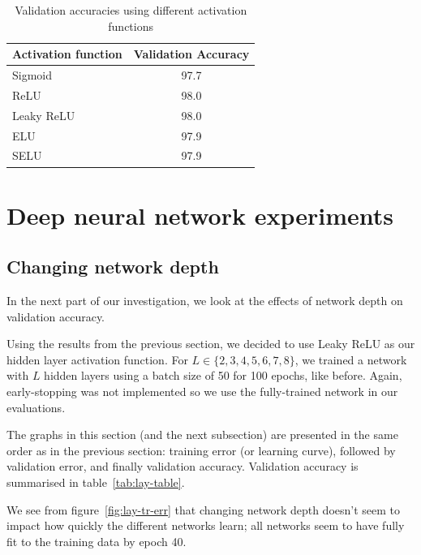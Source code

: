 \documentclass{article}
\begin{document}
\begin{table}[tb]
\vskip 3mm
\begin{center}
\begin{small}
\begin{sc}
\begin{tabular}{lc}
\hline
\abovespace\belowspace
Activation function & Validation Accuracy  \\
\hline
\abovespace
Sigmoid    & 97.7  \\
ReLU & 98.0  \\
Leaky ReLU    & 98.0 \\
ELU    &  97.9\\
SELU   &  97.9 \\
\end{tabular}
\end{sc}
\end{small}
\caption{Validation accuracies using different activation functions}
\label{tab:act-table}
\end{center}
\vskip -3mm
\end{table}

\section{Deep neural network experiments}
\label{sec:dnnexpts}
\subsection{Changing network depth}
In the next part of our investigation, we look at the effects of network depth on validation accuracy. 

Using the results from the previous section, we decided to use Leaky ReLU as our hidden layer activation function. For $L \in \{2, 3, 4, 5, 6, 7, 8\}$, we trained a network with $L$ hidden layers using a batch size of 50 for 100 epochs, like before. Again, early-stopping was not implemented so we use the fully-trained network in our evaluations.

The graphs in this section (and the next subsection) are presented in the same order as in the previous section: training error (or learning curve), followed by validation error, and finally validation accuracy. Validation accuracy is summarised in table~\ref{tab:lay-table}.

We see from figure~\ref{fig:lay-tr-err} that changing network depth doesn't seem to impact how quickly the different networks learn; all networks seem to have fully fit to the training data by epoch 40. 
\end{document}
